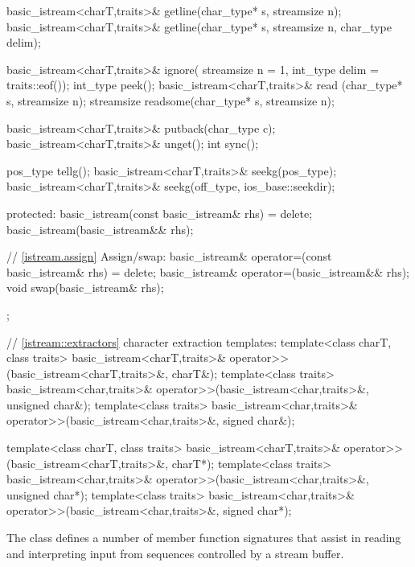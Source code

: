 \begin{codeblock}
{{    basic_istream<charT,traits>& getline(char_type* s, streamsize n);
    basic_istream<charT,traits>& getline(char_type* s, streamsize n,
                                         char_type delim);

    basic_istream<charT,traits>& ignore(
      streamsize n = 1, int_type delim = traits::eof());
    int_type                     peek();
    basic_istream<charT,traits>& read    (char_type* s, streamsize n);
    streamsize                   readsome(char_type* s, streamsize n);

    basic_istream<charT,traits>& putback(char_type c);
    basic_istream<charT,traits>& unget();
    int sync();

    pos_type tellg();
    basic_istream<charT,traits>& seekg(pos_type);
    basic_istream<charT,traits>& seekg(off_type, ios_base::seekdir);

  protected:
    basic_istream(const basic_istream& rhs) = delete;
    basic_istream(basic_istream&& rhs);

    // \ref{istream.assign} Assign/swap:
    basic_istream& operator=(const basic_istream& rhs) = delete;
    basic_istream& operator=(basic_istream&& rhs);
    void swap(basic_istream& rhs);
  };

  // \ref{istream::extractors} character extraction templates:
  template<class charT, class traits>
    basic_istream<charT,traits>& operator>>(basic_istream<charT,traits>&,
                                            charT&);
  template<class traits>
    basic_istream<char,traits>& operator>>(basic_istream<char,traits>&,
                                           unsigned char&);
  template<class traits>
    basic_istream<char,traits>& operator>>(basic_istream<char,traits>&,
                                           signed char&);

  template<class charT, class traits>
    basic_istream<charT,traits>& operator>>(basic_istream<charT,traits>&,
                                            charT*);
  template<class traits>
    basic_istream<char,traits>& operator>>(basic_istream<char,traits>&,
                                           unsigned char*);
  template<class traits>
    basic_istream<char,traits>& operator>>(basic_istream<char,traits>&,
                                           signed char*);
}
\end{codeblock}

\pnum
The class
defines a number of member function
signatures that assist in reading and interpreting input from sequences
controlled by a stream buffer.

